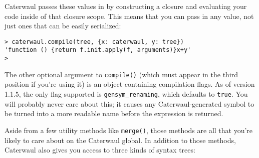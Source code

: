 \documentclass{report}
\begin{document}
\begin{enumerate}
  Caterwaul passes these values in by constructing a closure and evaluating your code inside of that closure scope. This means that you can pass in any value, not just ones that can be
  easily serialized:

\begin{verbatim}
> caterwaul.compile(tree, {x: caterwaul, y: tree})
'function () {return f.init.apply(f, arguments)}x+y'
>
\end{verbatim}

  The other optional argument to {\tt compile()} (which must appear in the third position if you're using it) is an object containing compilation flags. As of version 1.1.5, the only flag
  supported is \verb|gensym_renaming|, which defaults to {\tt true}. You will probably never care about this; it causes any Caterwaul-generated symbol to be turned into a more readable
  name before the expression is returned.
\end{enumerate}

  Aside from a few utility methods like {\tt merge()}, those methods are all that you're likely to care about on the Caterwaul global. In addition to those methods, Caterwaul also gives you
  access to three kinds of syntax trees:
\end{document}

